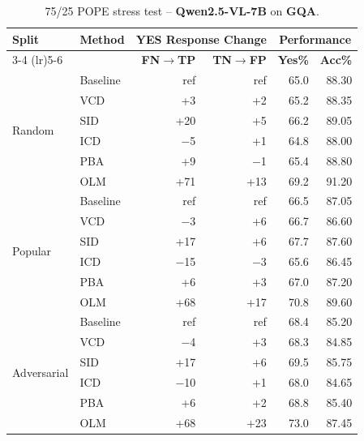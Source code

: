 \documentclass[11pt]{article}
\begin{document}

\begin{table}[ht]
\centering
\caption{75/25 POPE stress test -- \textbf{Qwen2.5-VL-7B} on \textbf{GQA}.}
\label{tab:75_25_qwen_gqa}
\setlength{\tabcolsep}{6pt}
\renewcommand{\arraystretch}{1.1}
\begin{tabular}{l|l|rr|rr}
\toprule
\multirow{2}{*}{\textbf{Split}} &
\multirow{2}{*}{\textbf{Method}} &
\multicolumn{2}{c|}{\textbf{YES Response Change}} &
\multicolumn{2}{c}{\textbf{Performance}} \\
\cmidrule(lr){3-4} \cmidrule(lr){5-6}
& & \textbf{FN$\to$TP} & \textbf{TN$\to$FP} & \textbf{Yes\%} & \textbf{Acc\%} \\
\midrule

\multirow{6}{*}{Random}
& Baseline & ref    & ref   & 65.0 & 88.30 \\
& VCD      & +3     & +2    & 65.2 & 88.35 \\
& SID      & +20    & +5    & 66.2 & 89.05 \\
& ICD      & $-$5   & +1    & 64.8 & 88.00 \\
& PBA      & +9     & $-$1  & 65.4 & 88.80 \\
& OLM      & +71    & +13   & 69.2 & 91.20 \\
\midrule

\multirow{6}{*}{Popular}
& Baseline & ref    & ref   & 66.5 & 87.05 \\
& VCD      & $-$3   & +6    & 66.7 & 86.60 \\
& SID      & +17    & +6    & 67.7 & 87.60 \\
& ICD      & $-$15  & $-$3  & 65.6 & 86.45 \\
& PBA      & +6     & +3    & 67.0 & 87.20 \\
& OLM      & +68    & +17   & 70.8 & 89.60 \\
\midrule

\multirow{6}{*}{Adversarial}
& Baseline & ref    & ref   & 68.4 & 85.20 \\
& VCD      & $-$4   & +3    & 68.3 & 84.85 \\
& SID      & +17    & +6    & 69.5 & 85.75 \\
& ICD      & $-$10  & +1    & 68.0 & 84.65 \\
& PBA      & +6     & +2    & 68.8 & 85.40 \\
& OLM      & +68    & +23   & 73.0 & 87.45 \\
\bottomrule
\end{tabular}
\end{table}
\end{document}
